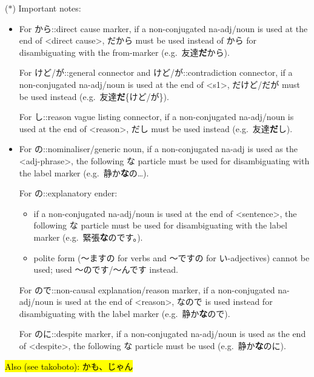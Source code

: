 \documentclass[../nihongo-gakushuu-kyouzai.tex]{subfiles}
\begin{document}
\color{red}
($*$) Important notes:
\begin{itemize}
    \item For から::direct cause marker, if a non-conjugated na-adj/noun is used at the end of <direct cause>, だから must be used instead of から for disambiguating with the from-marker (e.g.\ 友達\textbf{だ}から).

    For けど/が::general connector and けど/が::contradiction connector, if a non-conjugated na-adj/noun is used at the end of <s1>, だけど/だが must be used instead (e.g.\ 友達\textbf{だ}\{けど/が\}).

    For し::reason vague listing connector, if a non-conjugated na-adj/noun is used at the end of <reason>, だし must be used instead (e.g.\ 友達\textbf{だ}し).
    \item For の::nominaliser/generic noun, if a non-conjugated na-adj is used as the <adj-phrase>, the following な particle must be used for disambiguating with the label marker (e.g.\ 静か\textbf{な}の\dots).

    For の::explanatory ender:
    \begin{itemize}
        \item if a non-conjugated na-adj/noun is used at the end of <sentence>, the following な particle must be used for disambiguating with the label marker (e.g.\ 緊張\textbf{な}のです。).
        \item polite form (〜ますの for verbs and 〜ですの for い-adjectives) cannot be used; used 〜のです/〜んです instead.
    \end{itemize}

    For ので::non-causal explanation/reason marker, if a non-conjugated na-adj/noun is used at the end of <reason>, なので is used instead for disambiguating with the label marker (e.g.\ 静か\textbf{な}ので).

    For のに::despite marker, if a non-conjugated na-adj/noun is used as the end of <despite>, the following な particle must be used (e.g.\ 静か\textbf{な}のに).
\end{itemize}
\color{black}

\hl{Also (see takoboto): かも、じゃん}
\end{document}
